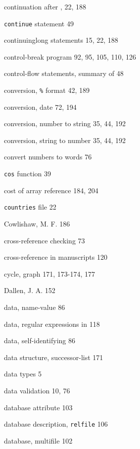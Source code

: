 \begin{multicols}{3}
\hangindent=4pc  continuation after , 22, 188

\hangindent=4pc  \verb'continue' statement 49

\hangindent=4pc  continuinglong statements 15, 22, 188

\hangindent=4pc  control-break program 92, 95, 105, 110, 126

\hangindent=4pc  control-flow statements, summary of 48

\hangindent=4pc  conversion, \verb'%' format 42, 189

\hangindent=4pc  conversion, date 72, 194

\hangindent=4pc  conversion, number to string 35, 44, 192

\hangindent=4pc  conversion, string to number 35, 44, 192

\hangindent=4pc  convert numbers to words 76

\hangindent=4pc  \verb'cos' function 39

\hangindent=4pc  cost of array reference 184, 204

\hangindent=4pc  \verb'countries' file 22

\hangindent=4pc  Cowlishaw, M. F. 186

\hangindent=4pc  cross-reference checking 73

\hangindent=4pc  cross-reference in manuscripts 120

\hangindent=4pc  cycle, graph 171, 173-174, 177

\hangindent=4pc  Dallen, J. A. 152

\hangindent=4pc  data, name-value 86

\hangindent=4pc  data, regular expressions in 118

\hangindent=4pc  data, self-identifying 86

\hangindent=4pc  data structure, successor-list 171

\hangindent=4pc  data types 5

\hangindent=4pc  data validation 10, 76

\hangindent=4pc  database attribute 103

\hangindent=4pc  database description, \verb'relfile' 106

\hangindent=4pc  database, multifile 102


\end{multicols}

